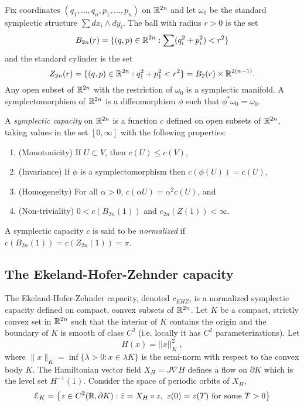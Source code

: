 \documentclass[../capacities_main.tex]{subfiles}
\begin{document}
	
	
	
	Fix coordinates $(q_1, \ldots ,q_n,p_1, \ldots ,p_n)$ on ${\mathbb R}^{2n}$ and let $\omega_0$ be the standard symplectic structure $\sum dx_i\wedge dy_i$.  The ball with radius $r>0$ is the set 
	\begin{equation*}
	B_{2n}(r) = \{ (q,p) \in {\mathbb R}^{2n} : \sum (q_i^2 + p_i^2)< r^2 \}
	\end{equation*}
	and the standard cylinder is the set 
	\begin{equation*}
	Z_{2n}(r) = \{ (q,p) \in {\mathbb R}^{2n} : q_1^2 + p_1^2< r^2 \} = B_2(r) \times {\mathbb R}^{2(n-1)}.
	\end{equation*}
	Any open subset of ${\mathbb R}^{2n}$ with the restriction of $\omega_0$ is a symplectic manifold.  A symplectomorphism of ${\mathbb R}^{2n}$ is a diffeomorphism $\phi$ such that $\phi^*\omega_0 = \omega_0$.
	
	\begin{Definition}
		A \emph{symplectic capacity} on ${\mathbb R}^{2n}$ is a function $c$ defined on open subsets of ${\mathbb R}^{2n}$, taking values in the set $[0,\infty]$ with the following properties:
		\begin{enumerate}
			\item (Monotonicity) If $U \subset V$, then $c(U) \leq c(V)$,
			\item (Invariance) If $\phi$ is a symplectomorphism then $c(\phi(U)) = c(U)$,
			\item (Homogeneity) For all $\alpha >0$, $c(\alpha U) = \alpha^2 c(U)$, and
			\item (Non-triviality) $0 < c(B_{2n}(1))$ and $c_{2n}(Z(1)) < \infty$.
		\end{enumerate}
		A symplectic capacity $c$ is said to be \emph{normalized} if $c(B_{2n}(1)) = c(Z_{2n}(1)) = \pi$.
	\end{Definition}
	
	\subsection{The Ekeland-Hofer-Zehnder capacity}
	
	The Ekeland-Hofer-Zehnder capacity, denoted $c_{EHZ}$, is a normalized symplectic capacity defined on compact, convex subsets of ${\mathbb R}^{2n}$. Let $K$ be a compact, strictly convex set in ${\mathbb R}^{2n}$ such that the interior of $K$ contains the origin and the boundary of $K$ is smooth of class $C^2$ (i.e. locally it has $C^2$ parameterizations).  Let
	\begin{equation*}
	H(x) = ||x||_K^2 \;,
	\end{equation*}
	where $\|x\|_K = \inf \{ \lambda > 0 : x\in \lambda K \}$ is the semi-norm with respect to the convex body $K$. 
	The Hamiltonian vector field $X_H = J\nabla H$ defines a flow on $\partial K$ which is the level set $H^{-1}(1)$.  Consider the space of periodic orbits of $X_H$, 
	\begin{equation*}
	\mathcal{E}_K = \left\{ z \in C^2( {\mathbb R},\partial K) : \dot z = X_H\circ z,\ z(0)=z(T) \text{ for some }T>0\right\}
	\end{equation*}
	
\end{document}

